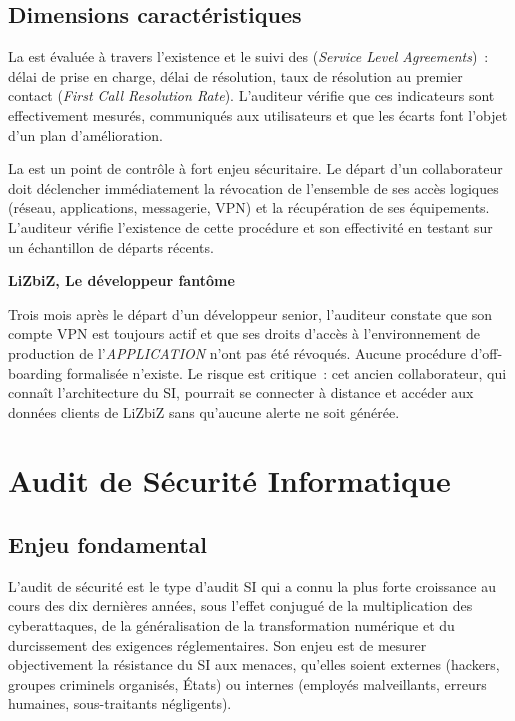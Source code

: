 \subsection{Dimensions caractéristiques}

La  est évaluée à travers l'existence
et le suivi des  (\textit{Service Level Agreements})~: délai de prise
en charge, délai de résolution, taux de résolution au premier contact (\textit{First
Call Resolution Rate}). L'auditeur vérifie que ces indicateurs sont effectivement
mesurés, communiqués aux utilisateurs et que les écarts font l'objet d'un plan
d'amélioration.

La  est un point de contrôle à fort enjeu
sécuritaire. Le départ d'un collaborateur doit déclencher immédiatement la révocation
de l'ensemble de ses accès logiques (réseau, applications, messagerie, VPN) et la
récupération de ses équipements. L'auditeur vérifie l'existence de cette procédure et
son effectivité en testant sur un échantillon de départs récents.

\begin{boxlizbiz}
\textbf{LiZbiZ, Le développeur fantôme}

Trois mois après le départ d'un développeur senior, l'auditeur constate que son
compte VPN est toujours actif et que ses droits d'accès à l'environnement de
production de l'\textit{APPLICATION} n'ont pas été révoqués. Aucune procédure
d'off-boarding formalisée n'existe. Le risque est critique~: cet ancien collaborateur,
qui connaît l'architecture du SI, pourrait se connecter à distance et accéder aux
données clients de LiZbiZ sans qu'aucune alerte ne soit générée.
\end{boxlizbiz}


\section{Audit de Sécurité Informatique}
\label{sec:audit-securite}

\subsection{Enjeu fondamental}

L'audit de sécurité est le type d'audit SI qui a connu la plus forte croissance au
cours des dix dernières années, sous l'effet conjugué de la multiplication des
cyberattaques, de la généralisation de la transformation numérique et du durcissement
des exigences réglementaires. Son enjeu est de mesurer objectivement la résistance
du SI aux menaces, qu'elles soient externes (hackers, groupes criminels organisés,
États) ou internes (employés malveillants, erreurs humaines, sous-traitants
négligents).

